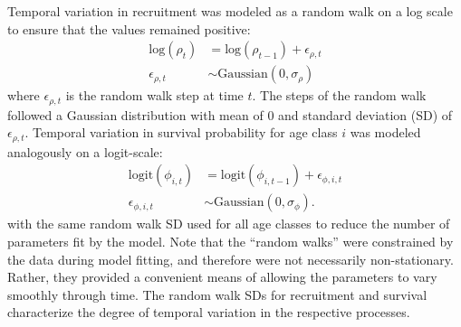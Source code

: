 \documentclass[11pt]{article}
\begin{document}
Temporal variation in recruitment was modeled as a random walk on a log scale to ensure
that the values remained positive:
%
\begin{equation} \label{eq:rho}
\begin{aligned}
\text{log}\left(\rho_t\right) &= \text{log}\left(\rho_{t - 1}\right) + \epsilon_{\rho,t} \\
\epsilon_{\rho,t} &\sim \text{Gaussian}\left(0, \sigma_{\rho} \right)
\end{aligned}
\end{equation}
%
where $\epsilon_{\rho,t}$ is the random walk step at time $t$.
The steps of the random walk followed a Gaussian distribution with mean of 0 
and standard deviation (SD) of $\epsilon_{\rho,t}$.
Temporal variation in survival probability for age class $i$ was modeled analogously 
on a logit-scale:
%
\begin{equation} \label{eq:phi}
\begin{aligned}
\text{logit}\left(\phi_{i, t}\right) &= \text{logit}\left(\phi_{i, t - 1}\right) +
                                          \epsilon_{\phi,i,t} \\
\epsilon_{\phi,i,t} &\sim \text{Gaussian}\left(0, \sigma_{\phi} \right)\text{.}
\end{aligned}
\end{equation}
%
with the same random walk SD used for all age classes 
to reduce the number of parameters fit by the model.
Note that the ``random walks''  were constrained by the data during model fitting,
and therefore were not necessarily non-stationary.
Rather, they provided a convenient means 
of allowing the parameters to vary smoothly through time.
The random walk SDs for recruitment and survival 
characterize the degree of temporal variation in the respective processes. 
\end{document}
